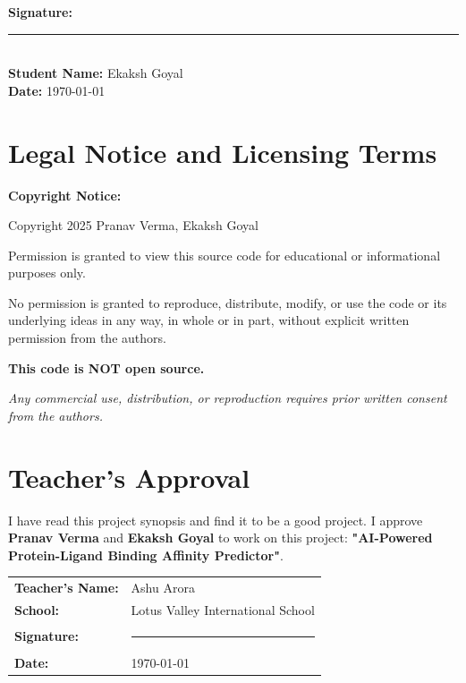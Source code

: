 \documentclass[12pt,a4paper]{article}
\begin{document}
\vspace{1cm}

\noindent\textbf{Signature:} \rule{5cm}{0.4pt}\\
\textbf{Student Name:} Ekaksh Goyal\\
\textbf{Date:} \today

\vspace{1cm}

\section*{Legal Notice and Licensing Terms}

\noindent\textbf{Copyright Notice:}

\vspace{0.3cm}

\noindent Copyright 2025 Pranav Verma, Ekaksh Goyal

\vspace{0.3cm}

\noindent Permission is granted to view this source code for educational or informational purposes only.

\vspace{0.3cm}

\noindent No permission is granted to reproduce, distribute, modify, or use the code or its underlying ideas in any way, in whole or in part, without explicit written permission from the authors.

\vspace{0.3cm}

\noindent\textbf{This code is NOT open source.}

\vspace{0.5cm}

\noindent\textit{Any commercial use, distribution, or reproduction requires prior written consent from the authors.}

\vspace{1cm}

\section*{Teacher's Approval}

\noindent I have read this project synopsis and find it to be a good project. I approve \textbf{Pranav Verma} and \textbf{Ekaksh Goyal} to work on this project: \textbf{"AI-Powered Protein-Ligand Binding Affinity Predictor"}.

\vspace{1cm}

\begin{tabular}{ll}
\textbf{Teacher's Name:} & Ashu Arora \\
\textbf{School:} & Lotus Valley International School \\
\textbf{Signature:} & \rule{5cm}{0.4pt} \\
\textbf{Date:} & \today
\end{tabular}
\end{document}
